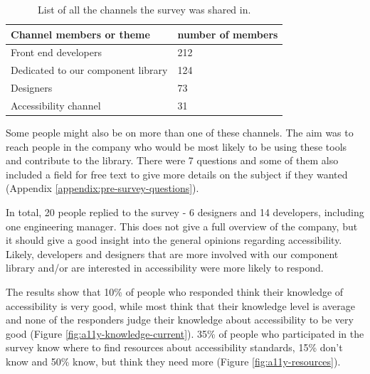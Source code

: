 \documentclass{master_thesis}
\begin{document}
\begin{table}[H]
	\centering
	\caption{List of all the channels the survey was shared in.}

	\begin{tabular}{|l|l|}
		\hline
		\textbf{Channel members or theme} & \textbf{number of members}  \\
		\hline
		Front end developers  & 212  \\
		\hline
		Dedicated to our component library  & 124  \\
		\hline
		Designers  & 73  \\
		\hline
		Accessibility channel  & 31  \\
		\hline
	\end{tabular}
	\label{table:survey-shared}
\end{table}

Some people might also be on more than one of these channels. The aim was to reach people in the company who would be most likely to be using these tools and contribute to the library. There were 7 questions and some of them also included a field for free text to give more details on the subject if they wanted (Appendix \ref{appendix:pre-survey-questions}).

In total, 20 people replied to the survey - 6 designers and 14 developers, including one engineering manager. This does not give a full overview of the company, but it should give a good insight into the general opinions regarding accessibility. Likely, developers and designers that are more involved with our component library and/or are interested in accessibility were more likely to respond.

The results show that 10\% of people who responded think their knowledge of accessibility is very good, while most think that their knowledge level is average and none of the responders judge their knowledge about accessibility to be very good (Figure \ref{fig:a11y-knowledge-current}). 35\% of people who participated in the survey know where to find resources about accessibility standards, 15\% don't know and 50\% know, but think they need more (Figure \ref{fig:a11y-resources}).
\end{document}
